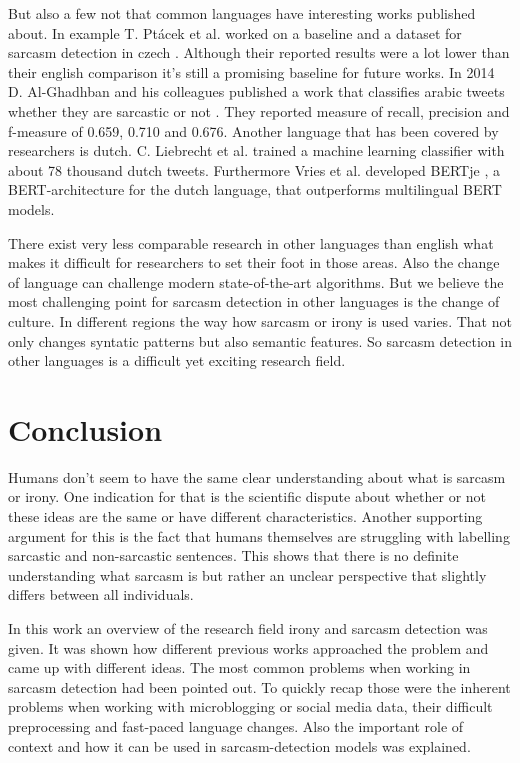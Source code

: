 \documentclass[sigconf,  review=false, nonacm=true]{acmart}
\begin{document}
But also a few not that common languages have interesting works published about. In example T. Ptácek et al. worked on a baseline and a dataset for sarcasm detection in czech \cite{czech}. Although their reported results were a lot lower than their english comparison it's still a promising baseline for future works. In 2014 D. Al-Ghadhban and his colleagues published a work that classifies arabic tweets whether they are sarcastic or not \cite{arabic}. They reported measure of recall, precision and f-measure of 0.659, 0.710 and 0.676. Another language that has been covered by researchers is dutch. C. Liebrecht et al. \cite{dutch} trained a machine learning classifier with about 78 thousand dutch tweets. Furthermore Vries et al. developed BERTje \cite{bertje}, a BERT-architecture for the dutch language, that outperforms multilingual BERT models.

There exist very less comparable research in other languages than english what makes it difficult for researchers to set their foot in those areas. Also the change of language can challenge modern state-of-the-art algorithms. But we believe the most challenging point for sarcasm detection in other languages is the change of culture. In different regions the way how sarcasm or irony is used varies. That not only changes syntatic patterns but also semantic features. So sarcasm detection in other languages is a difficult yet exciting research field.


\section{Conclusion}

Humans don't seem to have the same clear understanding about what is sarcasm or irony. One indication for that is the scientific dispute about whether or not these ideas are the same or have different characteristics. Another supporting argument for this is the fact that humans themselves are struggling with labelling sarcastic and non-sarcastic sentences. This shows that there is no definite understanding what sarcasm is but rather an unclear perspective that slightly differs between all individuals.

In this work an overview of the research field irony and sarcasm detection was given. It was shown how different previous works approached the problem and came up with different ideas. The most common problems when working in sarcasm detection had been pointed out. To quickly recap those were the inherent problems when working with microblogging or social media data, their difficult preprocessing and fast-paced language changes. Also the important role of context and how it can be used in sarcasm-detection models was explained. 
\end{document}
